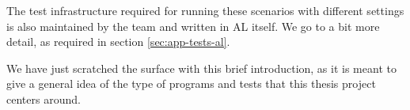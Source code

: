 The test infrastructure required for running these scenarios with different settings is also maintained
by the team and written in AL itself. We go to a bit more detail, as required in section \ref{sec:app-tests-al}.

We have just scratched the surface with this brief introduction, as it is meant to give a general idea of the
type of programs and tests that this thesis project centers around.